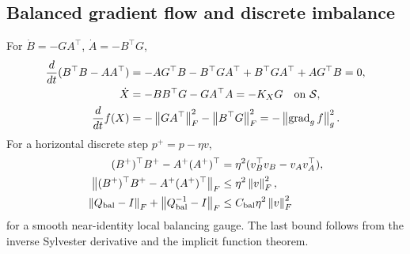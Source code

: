 \subsection{Balanced gradient flow and discrete imbalance}
\begin{proposition}
For $\dot B=-GA^\top$, $\dot A=-B^\top G$,
\begin{align}
\frac d{dt}(B^\top B-AA^\top)
&=-AG^\top B-B^\top GA^\top+B^\top GA^\top+AG^\top B=0,\\
\dot X&=-BB^\top G-GA^\top A=-K_XG
\quad\text{on }\mathcal S,\\
\frac d{dt}f(X)&=-\left\lVert GA^\top\right\rVert_F^2-\left\lVert B^\top G\right\rVert_F^2
=-\left\lVert\operatorname{grad}_g f\right\rVert_g^2.
\end{align}
For a horizontal discrete step $p^+=p-\eta v$,
\begin{align}
(B^+)^\top B^+-A^+(A^+)^\top
&=\eta^2(v_B^\top v_B-v_Av_A^\top),\\
\left\lVert(B^+)^\top B^+-A^+(A^+)^\top\right\rVert_F
&\leq\eta^2\left\lVert v\right\rVert_F^2,\\
\left\lVert Q_{\rm bal}-I\right\rVert_F+\left\lVert Q_{\rm bal}^{-1}-I\right\rVert_F
&\leq C_{\rm bal}\eta^2\left\lVert v\right\rVert_F^2
\end{align}
for a smooth near-identity local balancing gauge. The last bound follows
from the inverse Sylvester derivative and the implicit function theorem.
\end{proposition}


